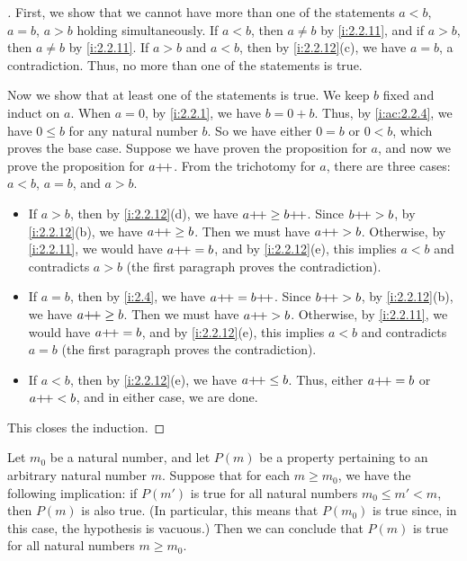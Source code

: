 \begin{proof}[]
  First, we show that we cannot have more than one of the statements \(a < b\), \(a = b\), \(a > b\) holding simultaneously.
  If \(a < b\), then \(a \neq b\) by \cref{i:2.2.11}, and if \(a > b\), then \(a \neq b\) by \cref{i:2.2.11}.
  If \(a > b\) and \(a < b\), then by \cref{i:2.2.12}(c), we have \(a = b\), a contradiction.
  Thus, no more than one of the statements is true.

  Now we show that at least one of the statements is true.
  We keep \(b\) fixed and induct on \(a\).
  When \(a = 0\), by \cref{i:2.2.1}, we have \(b = 0 + b\).
  Thus, by \cref{i:ac:2.2.4}, we have \(0 \leq b\) for any natural number \(b\).
  So we have either \(0 = b\) or \(0 < b\), which proves the base case.
  Suppose we have proven the proposition for \(a\), and now we prove the proposition for \(a{+}\!{+}\).
  From the trichotomy for \(a\), there are three cases: \(a < b\), \(a = b\), and \(a > b\).
  \begin{itemize}
    \item If \(a > b\), then by \cref{i:2.2.12}(d), we have \(a{+}\!{+} \geq b{+}\!{+}\).
          Since \(b{+}\!{+} > b\), by \cref{i:2.2.12}(b), we have \(a{+}\!{+} \geq b\).
          Then we must have \(a{+}\!{+} > b\).
          Otherwise, by \cref{i:2.2.11}, we would have \(a{+}\!{+} = b\), and by \cref{i:2.2.12}(e), this implies \(a < b\) and contradicts \(a > b\)
          (the first paragraph proves the contradiction).
    \item If \(a = b\), then by \cref{i:2.4}, we have \(a{+}\!{+} = b{+}\!{+}\).
          Since \(b{+}\!{+} > b\), by \cref{i:2.2.12}(b), we have \(a{+}\!{+} \geq b\).
          Then we must have \(a{+}\!{+} > b\).
          Otherwise, by \cref{i:2.2.11}, we would have \(a{+}\!{+} = b\), and by \cref{i:2.2.12}(e), this implies \(a < b\) and contradicts \(a = b\)
          (the first paragraph proves the contradiction).
    \item If \(a < b\), then by \cref{i:2.2.12}(e), we have \(a{+}\!{+} \leq b\).
          Thus, either \(a{+}\!{+} = b\) or \(a{+}\!{+} < b\), and in either case, we are done.
  \end{itemize}
  This closes the induction.
\end{proof}

\begin{prop}\label{i:2.2.14}
  Let \(m_0\) be a natural number, and let \(P(m)\) be a property pertaining to an arbitrary natural number \(m\).
  Suppose that for each \(m \geq m_0\), we have the following implication: if \(P(m')\) is true for all natural numbers \(m_0 \leq m' < m\), then \(P(m)\) is also true.
  (In particular, this means that \(P(m_0)\) is true since, in this case, the hypothesis is vacuous.)
  Then we can conclude that \(P(m)\) is true for all natural numbers \(m \geq m_0\).
\end{prop}

